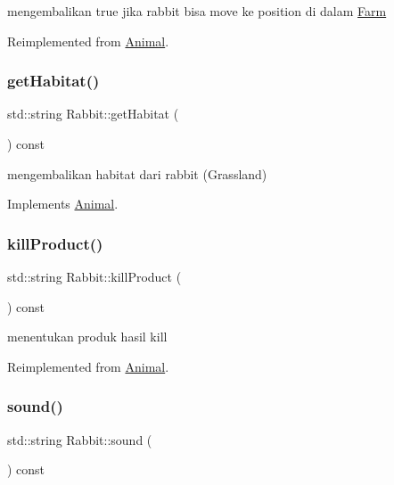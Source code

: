 mengembalikan true jika rabbit bisa move ke position di dalam \mbox{\hyperlink{class_farm}{Farm}} 

Reimplemented from \mbox{\hyperlink{class_animal_a0529aaf00a6368ea123110683cc4e2f2}{Animal}}.

\mbox{\label{class_rabbit_a2bb761dcc6979ff6db93d253fbe7a3b0}} 
\subsubsection{\texorpdfstring{getHabitat()}{getHabitat()}}
{\footnotesize\ttfamily std\+::string Rabbit\+::get\+Habitat (\begin{DoxyParamCaption}{ }\end{DoxyParamCaption}) const\hspace{0.3cm}{\ttfamily [virtual]}}

mengembalikan habitat dari rabbit (Grassland) 

Implements \mbox{\hyperlink{class_animal_a3de687fb42b792132a09176c4a0e2125}{Animal}}.

\mbox{\label{class_rabbit_a982b868df58d7ad6e7b4814f5fbe1473}} 
\subsubsection{\texorpdfstring{killProduct()}{killProduct()}}
{\footnotesize\ttfamily std\+::string Rabbit\+::kill\+Product (\begin{DoxyParamCaption}{ }\end{DoxyParamCaption}) const\hspace{0.3cm}{\ttfamily [virtual]}}

menentukan produk hasil kill 

Reimplemented from \mbox{\hyperlink{class_animal_a4d4e70aed7f889574600e8492f419948}{Animal}}.

\mbox{\label{class_rabbit_aa60f2e9bf2ca051d092c79c161b988b6}} 
\subsubsection{\texorpdfstring{sound()}{sound()}}
{\footnotesize\ttfamily std\+::string Rabbit\+::sound (\begin{DoxyParamCaption}{ }\end{DoxyParamCaption}) const\hspace{0.3cm}{\ttfamily [virtual]}}

